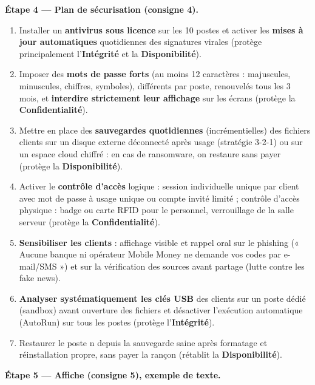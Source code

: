 \documentclass[11pt]{article}
\begin{document}
\begin{exoresolu}
\textbf{Étape 4 — Plan de sécurisation (consigne 4).}
\begin{enumerate}
  \item Installer un \textbf{antivirus sous licence} sur les 10 postes et activer les \textbf{mises à jour automatiques} quotidiennes des signatures virales (protège principalement l'\textbf{Intégrité} et la \textbf{Disponibilité}).
  \item Imposer des \textbf{mots de passe forts} (au moins 12 caractères : majuscules, minuscules, chiffres, symboles), différents par poste, renouvelés tous les 3 mois, et \textbf{interdire strictement leur affichage} sur les écrans (protège la \textbf{Confidentialité}).
  \item Mettre en place des \textbf{sauvegardes quotidiennes} (incrémentielles) des fichiers clients sur un disque externe déconnecté après usage (stratégie 3-2-1) ou sur un espace cloud chiffré : en cas de ransomware, on restaure sans payer (protège la \textbf{Disponibilité}).
  \item Activer le \textbf{contrôle d'accès} logique : session individuelle unique par client avec mot de passe à usage unique ou compte invité limité ; contrôle d'accès physique : badge ou carte RFID pour le personnel, verrouillage de la salle serveur (protège la \textbf{Confidentialité}).
  \item \textbf{Sensibiliser les clients} : affichage visible et rappel oral sur le phishing (« Aucune banque ni opérateur Mobile Money ne demande vos codes par e-mail/SMS ») et sur la vérification des sources avant partage (lutte contre les fake news).
  \item \textbf{Analyser systématiquement les clés USB} des clients sur un poste dédié (sandbox) avant ouverture des fichiers et désactiver l'exécution automatique (AutoRun) sur tous les postes (protège l'\textbf{Intégrité}).
  \item Restaurer le poste n depuis la sauvegarde saine après formatage et réinstallation propre, sans payer la rançon (rétablit la \textbf{Disponibilité}).
\end{enumerate}

\textbf{Étape 5 — Affiche (consigne 5), exemple de texte.}


\end{exoresolu}
\end{document}
